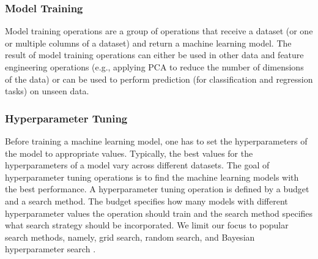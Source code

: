 \subsubsection{Model Training}
Model training operations are a group of operations that receive a dataset (or one or multiple columns of a dataset) and return a machine learning model.
The result of model training operations can either be used in other data and feature engineering operations (e.g., applying PCA to reduce the number of dimensions of the data) or can be used to perform prediction (for classification and regression tasks) on unseen data.

\subsubsection{Hyperparameter Tuning}
Before training a machine learning model, one has to set the hyperparameters of the model to appropriate values.
Typically, the best values for the hyperparameters of a model vary across different datasets.
The goal of hyperparameter tuning operations is to find the machine learning models with the best performance.
A hyperparameter tuning operation is defined by a budget and a search method.
The budget specifies how many models with different hyperparameter values the operation should train and the search method specifies what search strategy should be incorporated.
We limit our focus to popular search methods, namely, grid search, random search, and Bayesian hyperparameter search \cite{bergstra2012random,snoek2012practical}.


